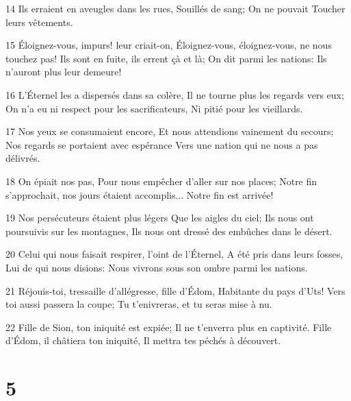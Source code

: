 \par 14 Ils erraient en aveugles dans les rues, Souillés de sang; On ne pouvait Toucher leurs vêtements.
\par 15 Éloignez-vous, impurs! leur criait-on, Éloignez-vous, éloignez-vous, ne nous touchez pas! Ils sont en fuite, ils errent çà et là; On dit parmi les nations: Ils n'auront plus leur demeure!
\par 16 L'Éternel les a dispersés dans sa colère, Il ne tourne plus les regards vers eux; On n'a eu ni respect pour les sacrificateurs, Ni pitié pour les vieillards.
\par 17 Nos yeux se consumaient encore, Et nous attendions vainement du secours; Nos regards se portaient avec espérance Vers une nation qui ne nous a pas délivrés.
\par 18 On épiait nos pas, Pour nous empêcher d'aller sur nos places; Notre fin s'approchait, nos jours étaient accomplis... Notre fin est arrivée!
\par 19 Nos persécuteurs étaient plus légers Que les aigles du ciel; Ils nous ont poursuivis sur les montagnes, Ils nous ont dressé des embûches dans le désert.
\par 20 Celui qui nous faisait respirer, l'oint de l'Éternel, A été pris dans leurs fosses, Lui de qui nous disions: Nous vivrons sous son ombre parmi les nations.
\par 21 Réjouis-toi, tressaille d'allégresse, fille d'Édom, Habitante du pays d'Uts! Vers toi aussi passera la coupe; Tu t'enivreras, et tu seras mise à nu.
\par 22 Fille de Sion, ton iniquité est expiée; Il ne t'enverra plus en captivité. Fille d'Édom, il châtiera ton iniquité, Il mettra tes péchés à découvert.

\chapter{5}

